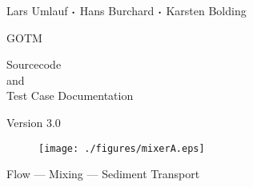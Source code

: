 \documentclass[letter,twoside]{article}
\begin{document}
\begin{titlepage}


{\sf \bf \LARGE
 \begin{center}
   Lars Umlauf ${\boldsymbol \cdot}$ Hans Burchard ${\boldsymbol \cdot}$ Karsten Bolding
 \end{center}
}

\vspace{14mm}

{\sf \bf \Huge
 \begin{center}
   GOTM 
 \end{center}
}

\vspace{6mm}

{\sf \bf \LARGE
 \begin{center}
   Sourcecode \\ 
      and \\ 
Test Case Documentation
 \end{center}
}


\vspace{5mm}

{\sf \bf \Large
 \begin{center}
  Version 3.0 
 \end{center}
}

\vspace{8mm}

\begin{figure}[!h]
  \begin{center}
  \texttt{[image: ./figures/mixerA.eps]}
  \end{center}
\end{figure}

\vspace{7mm}

{\sf \bf \Large
 \begin{center}
  Flow ---  Mixing --- Sediment Transport
\end{center}
}


\end{titlepage}


\cleardoublepage
\tableofcontents


\cleardoublepage
 


\cleardoublepage
   
        
\end{document}
